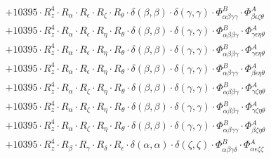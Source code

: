 \documentclass{article}
\begin{document}
\begin{subequations}
\begin{gather}
\begin{array}{c}
 \\[0.2em] 		 + 10395 \cdot R_{z}^{4} \cdot R_{\alpha{}} \cdot R_{\epsilon{}} \cdot R_{\zeta{}} \cdot R_{\theta{}} \cdot \delta{}\left(\beta{}, \beta{}\right) \cdot \delta{}\left(\gamma{}, \gamma{}\right) \cdot \Phi{}^{B}_{\alpha{}\beta{}\gamma{}\gamma{}} \cdot \Phi{}^{A}_{\beta{}\epsilon{}\zeta{}\theta{}} 
 \\[0.2em] 		 + 10395 \cdot R_{z}^{4} \cdot R_{\alpha{}} \cdot R_{\epsilon{}} \cdot R_{\eta{}} \cdot R_{\theta{}} \cdot \delta{}\left(\beta{}, \beta{}\right) \cdot \delta{}\left(\gamma{}, \gamma{}\right) \cdot \Phi{}^{B}_{\alpha{}\beta{}\beta{}\gamma{}} \cdot \Phi{}^{A}_{\gamma{}\epsilon{}\eta{}\theta{}} 
 \\[0.2em] 		 + 10395 \cdot R_{z}^{4} \cdot R_{\alpha{}} \cdot R_{\epsilon{}} \cdot R_{\eta{}} \cdot R_{\theta{}} \cdot \delta{}\left(\beta{}, \beta{}\right) \cdot \delta{}\left(\gamma{}, \gamma{}\right) \cdot \Phi{}^{B}_{\alpha{}\beta{}\beta{}\gamma{}} \cdot \Phi{}^{A}_{\gamma{}\epsilon{}\eta{}\theta{}} 
 \\[0.2em] 		 + 10395 \cdot R_{z}^{4} \cdot R_{\alpha{}} \cdot R_{\epsilon{}} \cdot R_{\eta{}} \cdot R_{\theta{}} \cdot \delta{}\left(\beta{}, \beta{}\right) \cdot \delta{}\left(\gamma{}, \gamma{}\right) \cdot \Phi{}^{B}_{\alpha{}\beta{}\gamma{}\gamma{}} \cdot \Phi{}^{A}_{\beta{}\epsilon{}\eta{}\theta{}} 
 \\[0.2em] 		 + 10395 \cdot R_{z}^{4} \cdot R_{\alpha{}} \cdot R_{\zeta{}} \cdot R_{\eta{}} \cdot R_{\theta{}} \cdot \delta{}\left(\beta{}, \beta{}\right) \cdot \delta{}\left(\gamma{}, \gamma{}\right) \cdot \Phi{}^{B}_{\alpha{}\beta{}\beta{}\gamma{}} \cdot \Phi{}^{A}_{\gamma{}\zeta{}\eta{}\theta{}} 
 \\[0.2em] 		 + 10395 \cdot R_{z}^{4} \cdot R_{\alpha{}} \cdot R_{\zeta{}} \cdot R_{\eta{}} \cdot R_{\theta{}} \cdot \delta{}\left(\beta{}, \beta{}\right) \cdot \delta{}\left(\gamma{}, \gamma{}\right) \cdot \Phi{}^{B}_{\alpha{}\beta{}\beta{}\gamma{}} \cdot \Phi{}^{A}_{\gamma{}\zeta{}\eta{}\theta{}} 
 \\[0.2em] 		 + 10395 \cdot R_{z}^{4} \cdot R_{\alpha{}} \cdot R_{\zeta{}} \cdot R_{\eta{}} \cdot R_{\theta{}} \cdot \delta{}\left(\beta{}, \beta{}\right) \cdot \delta{}\left(\gamma{}, \gamma{}\right) \cdot \Phi{}^{B}_{\alpha{}\beta{}\gamma{}\gamma{}} \cdot \Phi{}^{A}_{\beta{}\zeta{}\eta{}\theta{}} 
 \\[0.2em] 		 + 10395 \cdot R_{z}^{4} \cdot R_{\beta{}} \cdot R_{\gamma{}} \cdot R_{\delta{}} \cdot R_{\epsilon{}} \cdot \delta{}\left(\alpha{}, \alpha{}\right) \cdot \delta{}\left(\zeta{}, \zeta{}\right) \cdot \Phi{}^{B}_{\alpha{}\beta{}\gamma{}\delta{}} \cdot \Phi{}^{A}_{\alpha{}\epsilon{}\zeta{}\zeta{}} 

\end{array}
\end{gather}
\end{subequations}
\end{document}
